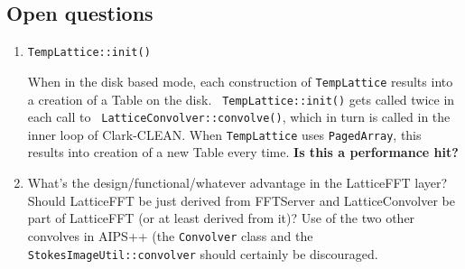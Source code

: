 \subsection{Open questions}
\label{A:QUESTIONS}

\begin{enumerate}
\item {\tt TempLattice::init()}

When in the disk based mode, each construction of {\tt TempLattice}
results into a creation of a Table on the disk.  {\tt
TempLattice::init()} gets called twice in each call to {\tt
LatticeConvolver::convolve()}, which in turn is called in the inner
loop of Clark-CLEAN.  When {\tt TempLattice} uses {\tt PagedArray},
this results into creation of a new Table every time.  {\bf Is this a
performance hit?}

\item What's the design/functional/whatever advantage in the
LatticeFFT layer?  Should LatticeFFT be just derived from FFTServer
and LatticeConvolver be part of LatticeFFT (or at least derived from
it)?  Use of the two other convolves in AIPS++ (the {\tt Convolver}
class and the {\tt StokesImageUtil::convolver} should certainly be
discouraged.








\end{enumerate}




